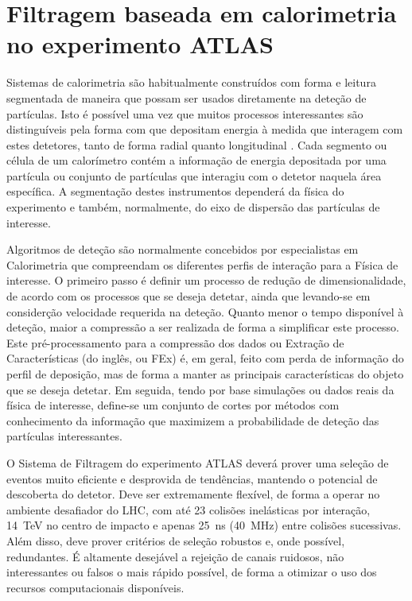 \typeout{ ====================================================================}
\typeout{ ====================================================================}

\chapter{Filtragem baseada em calorimetria no experimento ATLAS}
\label{chap:baseline}

Sistemas de calorimetria são habitualmente construídos com forma e leitura
segmentada de maneira que possam ser usados diretamente na dete\-ção de
par\-tí\-culas. Isto é possível uma vez que muitos processos interessantes são
distinguíveis pela forma com que depositam energia à medida que interagem com
estes detetores, tanto de forma radial quanto longitudinal
\cite{wigmans-book}. Cada segmento ou célula de um calorímetro contém a
informação de energia depositada por uma par\-tí\-cula ou conjunto de
par\-tí\-culas que interagiu com o detetor naquela área espe\-cí\-fica. A
seg\-men\-ta\-ção destes instrumentos dependerá da física do experimento e
também, normalmente, do eixo de dispersão das partículas de interesse.

Algoritmos de dete\-ção são normalmente concebidos por especialistas em
Calorimetria que compreendam os diferentes perfis de intera\-ção para a
Fí\-sica de interesse. O primeiro passo é definir um processo de redu\-ção de
dimensionalidade, de acordo com os processos que se deseja detetar, ainda que
levando-se em considerção velocidade requerida na deteção. Quanto menor o
tempo disponível à deteção, maior a compressão a ser realizada de forma a
simplificar este processo. Este pré-processamento para a compressão dos dados
ou Extração de Características (do inglês,  ou FEx) é,
em geral, feito com perda de informação do perfil de deposição, mas de forma a
manter as principais características do objeto que se deseja detetar. Em
seguida, tendo por base simulações ou dados reais da física de interesse,
define-se um conjunto de cortes por métodos com conhecimento da informação
 que maximizem a probabilidade de deteção das partículas
interessantes.

O Sistema de Filtragem  do experimento ATLAS deverá prover uma
seleção de eventos muito eficiente e desprovida de tendências, mantendo o
potencial de descoberta do detetor. Deve ser extremamente flexível, de forma a
operar no ambiente desafiador do LHC, com até 23 colisões inelásticas por
interação, 14~TeV no centro de impacto e apenas 25~ns (40~MHz) entre colisões
sucessivas. Além disso, deve prover critérios de seleção robustos e, onde
possível, redundantes. É altamente desejável a rejeição de canais ruidosos,
não interessantes ou falsos o mais rápido possível, de forma a otimizar o uso
dos recursos computacionais disponíveis.

